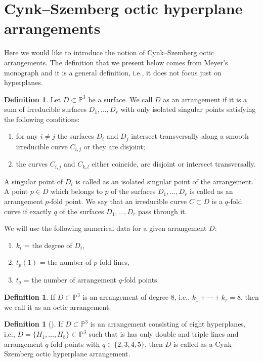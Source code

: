 \documentclass[11pt]{article}
\theoremstyle{plain}
\theoremstyle{definition}
\newtheorem{definition}[thm]{Definition}
\begin{document}
\section{Cynk--Szemberg octic hyperplane arrangements}
Here we would like to introduce the notion of Cynk--Szemberg octic arrangements. The definition that we present below comes from Meyer's monograph \cite[Section 4.1]{Meyer} and it is a general definition, i.e., it does not focus just on hyperplanes.
\begin{definition}
Let $D \subset \mathbb{P}^{3}$ be a surface. We call $D$ as an arrangement if it is a sum of irreducible surfaces $D_{1}, \ldots , D_{r}$ with only isolated singular points satisfying the following conditions:
\begin{enumerate}
    \item for any $i\neq j$ the surfaces $D_{i}$ and $D_{j}$ intersect transversally along a smooth irreducible curve $C_{i,j}$ or they are disjoint;
    \item the curves $C_{i,j}$ and $C_{k,l}$ either coincide, are disjoint or intersect transversally.
\end{enumerate}
A singular point of $D_{i}$ is called as an isolated singular point of the arrangement. A point $p \in D$ which belongs to $p$ of the surfaces $D_{1}, \ldots, D_{r}$ is called as an arrangement $p$-fold point. We say that an irreducible curve $C \subset D$ is a $q$-fold curve if exactly $q$ of the surfaces $D_{1}, \ldots, D_{r}$ pass through it.
\end{definition}
We will use the following numerical data for a given arrangement $D$:
\begin{enumerate}
\item[a)] $k_{i}$ = the degree of $D_{i}$,
\item[b)] $t_{p}(1)$ = the number of $p$-fold lines,
\item[c)] $t_{q}$ = the number of arrangement $q$-fold points.
\end{enumerate}
\begin{definition}
If $D \subset \mathbb{P}^{3}$ is an arrangement of degree $8$, i.e., $k_{1} + \cdots + k_{r} =8$, then we call it as an octic arrangement.
\end{definition}
\begin{definition}[{\cite[Section 1]{Cynks}}]
If $D \subset \mathbb{P}^{3}$ is an arrangement consisting of eight hyperplanes, i.e., $D=\{H_{1}, \ldots, H_{8}\} \subset \mathbb{P}^{3}$ such that is has only double and triple lines and arrangement $q$-fold points with $q \in \{2,3,4,5\}$, then $D$ is called as a Cynk--Szemberg octic hyperplane arrangement.
\end{definition}
\end{document}
